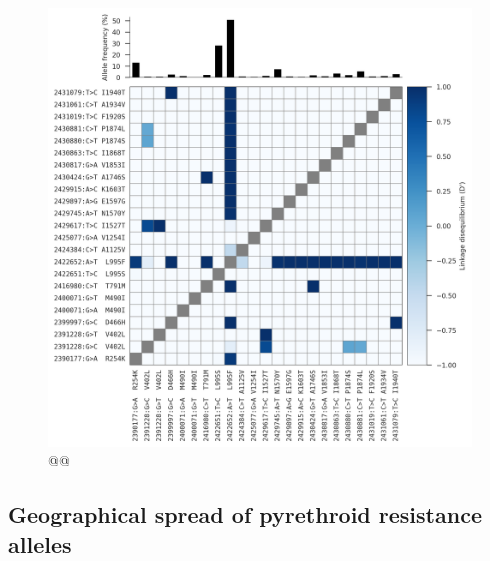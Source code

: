 \documentclass[a4paper,11pt,abstracton,hidelinks]{scrartcl}
\begin{document}
\begin{figure}[t!]
\centering
\includegraphics[width=0.9\linewidth,center]{artwork/chapter6/ld.png}
\caption{@@
}
\label{fig:ld}
\end{figure}


\subsection{Geographical spread of pyrethroid resistance alleles}\label{subsec:results-spread}
\end{document}
